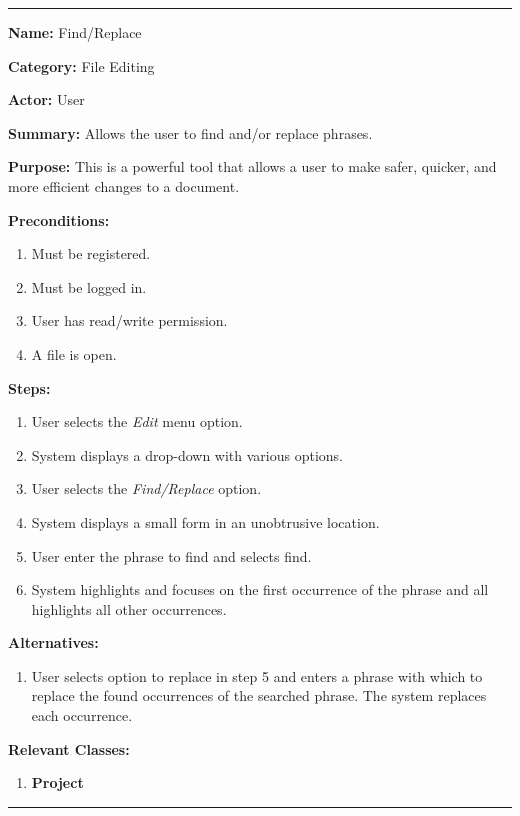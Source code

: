 \documentclass[twoside,letterpaper]{article}
\begin{document}
	\vspace{2pt}
	\hrule
	\vspace{8pt}
		\noindent\textbf{Name:} Find/Replace \newline
		
		\noindent\textbf{Category:} File Editing \newline
		
		\noindent\textbf{Actor:} User \newline
		
		\noindent\textbf{Summary:} Allows the user to find and/or replace phrases. \newline
		
		\noindent\textbf{Purpose:} This is a powerful tool that allows a user to make safer, quicker, and more efficient changes to a document. \newline
		
		\noindent\textbf{Preconditions:}
		\begin{enumerate}
			\item Must be registered.
			\item Must be logged in.
			\item User has read/write permission.
			\item A file is open.
		\end{enumerate}
		\noindent\textbf{Steps:}
		\begin{enumerate}
			\item User selects the \textit{Edit} menu option.
			\item System displays a drop-down with various options.
			\item User selects the \textit{Find/Replace} option.
			\item System displays a small form in an unobtrusive location.
			\item User enter the phrase to find and selects find.
			\item System highlights and focuses on the first occurrence of the phrase and all highlights all other occurrences.
		\end{enumerate}
		\noindent\textbf{Alternatives:}
		\begin{enumerate}
			\item User selects option to replace in step 5 and enters a phrase with which to replace the found occurrences of the searched phrase. The system replaces each occurrence.
		\end{enumerate}
		\noindent\textbf{Relevant Classes:}
		\begin{enumerate}
			\item \textbf{Project}
		\end{enumerate}
	\hrule
	\vspace{8pt}
	\newpage
	
\end{document}
